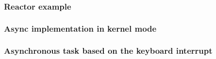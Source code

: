 % 
% 
% 
% 
\begin{frame}[fragile]
    \frametitle{Reactor example}
\end{frame}
% 
% 
% 
\begin{frame}[fragile]
    \frametitle{Async implementation in kernel mode}
\end{frame}
% 
% 
% 
% 
% 
% 
% 
% 
\begin{frame}[fragile]
    \frametitle{Asynchronous task based on the keyboard interrupt}
\end{frame}
% 
% 
